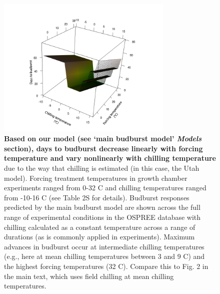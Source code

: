 \documentclass{article}
\begin{document}
\begin{figure}[h!]
\centering
\noindent \includegraphics[width=0.75\textwidth]{..//..//analyses/bb_analysis/figures/bbmod_3dplot_utah.png}
\caption{\textbf{Based on our model (see `main budburst model' \emph{Models} section), days to budburst decrease linearly with forcing temperature and vary nonlinearly with chilling temperature} due to the way that chilling is estimated (in this case, the Utah model). Forcing treatment temperatures in growth chamber experiments ranged from 0-32 \degree C and chilling temperatures ranged from -10-16 \degree C (see Table 2S for details). Budburst responses predicted by the main budburst model are shown across the full range of experimental conditions in the OSPREE database with chilling calculated as a constant temperature across a range of durations (as  is commonly applied in experiments). Maximum advances in budburst occur at intermediate chilling temperatures (e.g., here at mean chilling temperatures between 3 and 9 \degree C) and the highest forcing temperatures (32 \degree C). Compare this to Fig. 2 in the main text, which uses field chilling at mean chilling temperatures.}
\label{fig:3dexpchillutah}
\end{figure}
\end{document}
